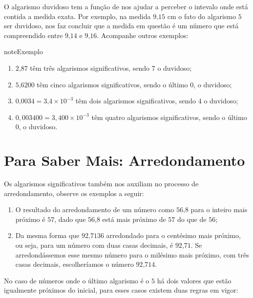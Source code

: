 O algarismo duvidoso tem a função de nos ajudar a perceber o intevalo onde está contida a medida exata. Por exemplo, na medida \(9\text{,}15\) cm o fato do algarismo \(5\) ser duvidoso, nos faz concluir que a medida em questão é um número que está compreendido entre \(9\text{,}14\) e \(9\text{,}16\). Acompanhe outros exemplos:

\begin{sphinxadmonition}{note}{Exemplo}
\begin{enumerate}
\item {} 
\(2\text{,}87\) têm três algarismos significativos, sendo \(7\) o duvidoso;

\item {} 
\(5\text{,}6200\) têm cinco algarismos significativos, sendo o último \(0\), o duvidoso;

\item {} 
\(0\text{,}0034 = 3\text{,}4 \times 10^{-3}\) têm dois algarismos significativos, sendo \(4\) o duvidoso;

\item {} 
\(0,003400 = 3,400 \times 10^{-3}\) têm quatro algarismos significativos, sendo o último \(0\), o duvidoso.

\end{enumerate}
\end{sphinxadmonition}


\section{Para Saber Mais: Arredondamento}
\label{\detokenize{NO103-5:para-saber-mais-arredondamento}}
Os algarismos significativos também nos auxiliam no processo de arredondamento, observe os exemplos a seguir:
\begin{enumerate}
\item {} 
O resultado do arredondamento de um número como \(56\text{,}8\) para o inteiro mais próximo é \(57\), dado que \(56\text{,}8\) está mais próximo de \(57\) do que de \(56\);

\item {} 
Da mesma forma que \(92\text{,}7136\) arredondado para o centésimo mais próximo, ou seja, para um número com duas casas decimais, é \(92\text{,}71\). Se arredondássemos esse mesmo número para o milésimo mais próximo, com três casas decimais, escolheríamos o número \(92\text{,}714\).

\end{enumerate}

No caso de números onde o último algarismo é o \(5\) há dois valores que estão igualmente próximos do inicial, para esses casos existem duas regras em vigor:

